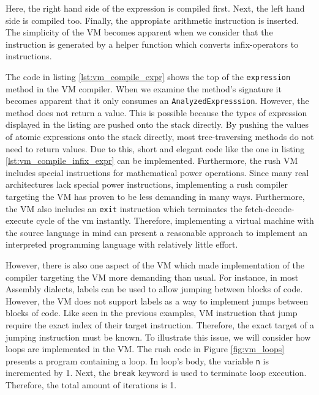 
Here, the right hand side of the expression is compiled first.
Next, the left hand side is compiled too.
Finally, the appropiate arithmetic instruction is inserted.
The simplicity of the VM becomes apparent when we consider that the instruction is generated by a helper function which converts infix-operators to instructions.


The code in listing \ref{lst:vm_compile_expr} shows the top of the \texttt{expression} method in the VM compiler.
When we examine the method's signature it becomes apparent that it only consumes an \texttt{AnalyzedExpresssion}.
However, the method does not return a value.
This is possible because the types of expression displayed in the listing are pushed onto the stack directly.
By pushing the values of atomic expressions onto the stack directly, most tree-traversing methods do not need to return values.
Due to this, short and elegant code like the one in listing \ref{lst:vm_compile_infix_expr} can be implemented.
Furthermore, the rush VM includes special instructions for mathematical power operations.
Since many real architectures lack special power instructions, implementing a rush compiler targeting the VM has proven to be less demanding in many ways.
Furthermore, the VM also includes an \texttt{exit} instruction which terminates the fetch-decode-execute cycle of the vm instantly.
Therefore, implementing a virtual machine with the source language in mind can present a reasonable approach to implement an interpreted programming language with relatively little effort.

However, there is also one aspect of the VM which made implementation of the compiler targeting the VM more demanding than usual.
For instance, in most Assembly dialects, labels can be used to allow jumping between blocks of code.
However, the VM does not support labels as a way to implement jumps between blocks of code.
Like seen in the previous examples, VM instruction that jump require the exact index of their target instruction.
Therefore, the exact target of a jumping instruction must be known.
To illustrate this issue, we will consider how loops are implemented in the VM.
The rush code in Figure \ref{fig:vm_loops} presents a program containing a loop.
In loop's body, the variable \texttt{n} is incremented by 1.
Next, the \texttt{break} keyword is used to terminate loop execution.
Therefore, the total amount of iterations is 1.

